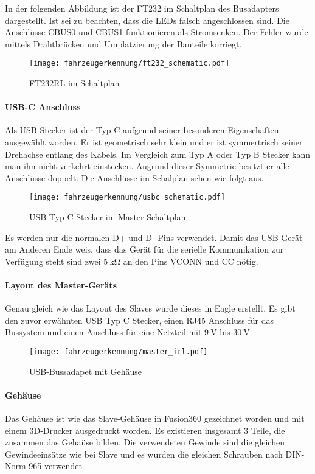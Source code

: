 In der folgenden Abbildung ist der FT232 im Schaltplan des Busadapters dargestellt. Ist sei zu beachten, dass die LEDs falsch angeschlossen sind. Die Anschlüsse CBUS0 und CBUS1 funktionieren als Stromsenken. 
Der Fehler wurde mittels Drahtbrücken und Umplatzierung der Bauteile korriegt.
\begin{figure}[H]
    \centering
    \texttt{[image: fahrzeugerkennung/ft232\_schematic.pdf]}
    \caption{FT232RL im Schaltplan}
\end{figure}

\paragraph{USB-C Anschluss}\mbox{} 

Als USB-Stecker ist der Typ C aufgrund seiner besonderen Eigenschaften ausgewählt worden. Er ist geometrisch sehr klein und er ist symmertrisch seiner Drehachse entlang des Kabels. Im Vergleich zum Typ A oder Typ B Stecker 
kann man ihn nicht verkehrt einstecken. Augrund dieser Symmetrie besitzt er alle Anschlüsse doppelt. Die Anschlüsse im Schalplan sehen wie folgt aus.

\begin{figure}[H]
    \centering
    \texttt{[image: fahrzeugerkennung/usbc\_schematic.pdf]}
    \caption{USB Typ C Stecker im Master Schaltplan}
\end{figure}

Es werden nur die normalen D+ und D- Pins verwendet. Damit das USB-Gerät am Anderen Ende weis, dass das Gerät für die serielle Kommunikation zur Verfügung steht sind zwei $\SI{5}{\kilo\ohm}$ an den Pins VCONN und CC nötig.

\paragraph{Layout des Master-Geräts} \mbox{} 

Genau gleich wie das Layout des Slaves wurde dieses in Eagle erstellt. Es gibt den zuvor erwähnten USB Typ C Stecker, einen RJ45 Anschluss für das Bussystem und einen Anschluss für eine Netzteil mit $\SI{9}{\volt}$ bis 
$\SI{30}{\volt}$.

\begin{figure}[H]
    \centering
    \texttt{[image: fahrzeugerkennung/master\_irl.pdf]}
    \caption{USB-Bussadapet mit Gehäuse}
\end{figure}

\paragraph{Gehäuse}\mbox{} 
Das Gehäuse ist wie das Slave-Gehäuse in Fusion360 gezeichnet worden und mit einem 3D-Drucker ausgedruckt worden. Es existieren insgesamt 3 Teile, die zusammen das Gehaüse bilden.
Die verwendeten Gewinde sind die gleichen Gewindeeinsätze wie bei Slave und es wurden die gleichen Schrauben nach DIN-Norm 965 verwendet.

